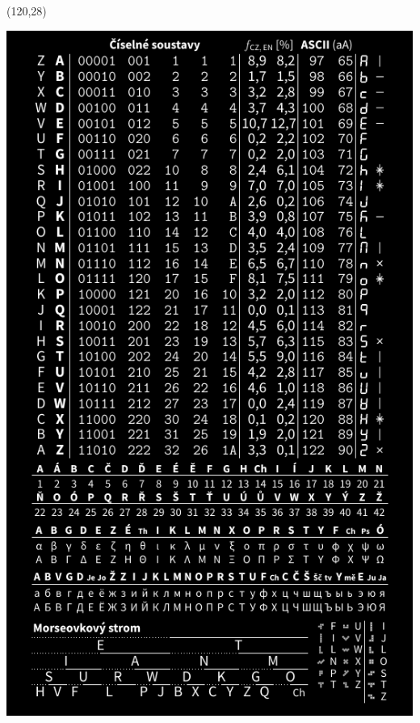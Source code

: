 \documentclass{extarticle}
\begin{document}
\begin{textblock}{92}(120,28)
\vfill
{\centerline{\includegraphics[scale=1,]{tools-wide-back.pdf}}} 
\vfill
\end{textblock}
\end{document}
